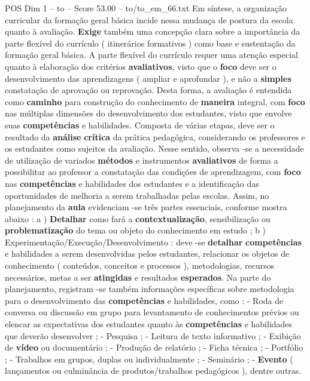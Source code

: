 \begin{textsample}{POS Dim 1 – to – Score 53.00 – to/to\_em\_66.txt}
Em síntese, a organização curricular da formação geral básica incide nessa mudança de postura da escola quanto à avaliação. \textbf{Exige} também uma concepção clara sobre a importância da parte flexível do currículo ( itinerários formativos ) como base e sustentação da formação geral básica.
A parte flexível do currículo requer uma atenção especial quanto à elaboração dos critérios \textbf{avaliativos}, visto que o \textbf{foco} deve ser o desenvolvimento das aprendizagens ( ampliar e aprofundar ), e não a \textbf{simples} constatação de aprovação ou reprovação.
Desta forma, a avaliação é entendida como \textbf{caminho} para construção do conhecimento de \textbf{maneira} integral, com \textbf{foco} nas múltiplas dimensões do desenvolvimento dos estudantes, visto que envolve suas \textbf{competências} e habilidades.
Composta de várias etapas, deve ser o resultado da \textbf{análise} \textbf{crítica} da prática pedagógica, considerando os professores e os estudantes como sujeitos da avaliação.
Nesse sentido, observa -se a necessidade de utilização de variados \textbf{métodos} e instrumentos \textbf{avaliativos} de forma a possibilitar ao professor a constatação das condições de aprendizagem, com \textbf{foco} nas \textbf{competências} e habilidades dos estudantes e a identificação das oportunidades de melhoria a serem trabalhadas pelas escolas.
Assim, no planejamento da \textbf{aula} evidenciam -se três partes essenciais, conforme mostra abaixo : a ) \textbf{Detalhar} como fará a \textbf{contextualização}, sensibilização ou \textbf{problematização} do tema ou objeto do conhecimento em estudo ; b ) Experimentação/Execução/Desenvolvimento : deve -se \textbf{detalhar} \textbf{competências} e habilidades a serem desenvolvidas pelos estudantes, relacionar os objetos de conhecimento ( conteúdos, conceitos e processos ), metodologias, recursos necessários, metas a ser \textbf{atingidas} e resultados \textbf{esperados}.
Na parte do planejamento, registram -se também informações específicas sobre metodologia para o desenvolvimento das \textbf{competências} e habilidades, como : - Roda de conversa ou discussão em grupo para levantamento de conhecimentos prévios ou elencar as expectativas dos estudantes quanto às \textbf{competências} e habilidades que deverão desenvolver ; - Pesquisa ; - Leitura de texto informativo ; - Exibição de \textbf{vídeo} ou documentário ; - Produção de relatório ; - Ficha técnica ; - Portfólio ; - Trabalhos em grupos, duplas ou individualmente ; - Seminário ; - \textbf{Evento} ( lançamentos ou culminância de produtos/trabalhos pedagógicos ), dentre outras.

\end{textsample}
